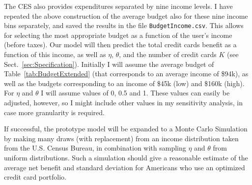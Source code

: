 The CES also provides expenditures separated by nine income levels. 
I have repeated the above construction of the average budget also for these nine income bins separately, and saved the results in the file \texttt{BudgetIncome.csv}.
This allows for selecting the most appropriate budget as a function of the user's income (before taxes).
Our model will then predict the total credit cards benefit as a function of this income, as well as $\eta$, $\theta$, and the number of credit cards $K$ (see Sect.~\ref{sec:Specification}). 
Initially I will assume the average budget of Table~\ref{tab:BudgetExtended} (that corresponds to an average income of \$94k), as well as the budgets corresponding to an income of \$45k (low) and \$160k (high). 
For $\eta$ and $\theta$ I will assume values of 0, 0.5 and 1. 
These values can easily be adjusted, however, so I might include other values in my sensitivity analysis, in case more granularity is required. 

If successful, the prototype model will be expanded to a Monte Carlo Simulation by making many draws (with replacement) from an income distribution taken from the U.S. Census Bureau, in combination with sampling $\eta$ and $\theta$ from uniform distributions.
Such a simulation should give a reasonable estimate of the average net benefit and standard deviation for Americans who use an optimized credit card portfolio. 

